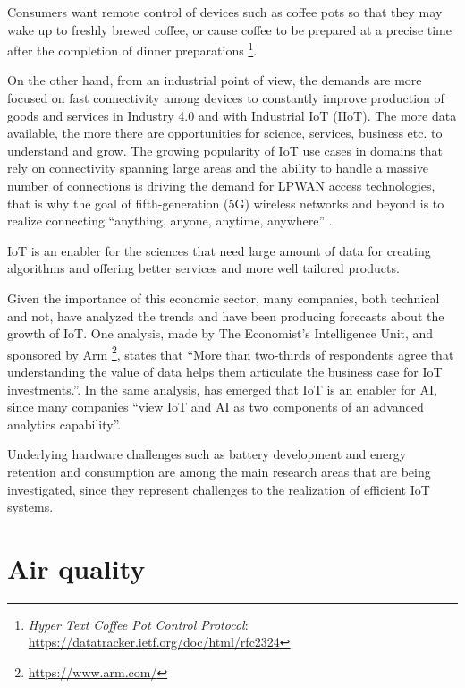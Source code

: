 			Consumers want remote control of devices such as coffee pots so that they may wake up to freshly	brewed coffee, or cause coffee to be prepared at a precise time after the completion of dinner preparations \footnote{\textit{Hyper Text Coffee Pot Control Protocol}: \url{https://datatracker.ietf.org/doc/html/rfc2324}}.
			
			On the other hand, from an industrial point of view, the demands are more focused on fast connectivity among devices to constantly improve production of goods and services in Industry 4.0 and with Industrial IoT (IIoT).
			The more data available, the more there are opportunities for science, services, business etc. to understand and grow.
			The growing popularity of IoT use cases in domains that rely on connectivity spanning large areas and the ability to handle a massive number of connections is driving the demand for LPWAN access technologies, that is why the goal of fifth-generation (5G) wireless networks and beyond is to realize connecting “anything, anyone, anytime, anywhere” \cite{7414384}.

			IoT is an enabler for the sciences that need large amount of data for creating algorithms and offering better services and more well tailored products.
			
			Given the importance of this economic sector, many companies, both technical and not, have analyzed the trends and have been producing forecasts about the growth of IoT.
			One analysis, made by The Economist's Intelligence Unit, and sponsored by Arm \footnote{\url{https://www.arm.com/}}, states that ``More than two-thirds of respondents agree that understanding the value of data helps them articulate the business case for IoT investments.''\cite{economist-iot-business-index-2020-arm}.
			In the same analysis, has emerged that IoT is an enabler for AI, since many companies ``view IoT and AI as two components of an advanced analytics capability''.
	
			Underlying hardware challenges such as battery development and energy retention and consumption are among the main research areas that are being investigated, since they represent challenges to the realization of efficient IoT systems.
				
	\section{Air quality}
	

